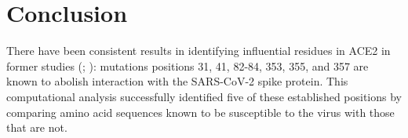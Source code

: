 \section{Conclusion}

There have been consistent results in identifying influential residues in ACE2 in former studies (; ): mutations positions 31, 41, 82-84, 353, 355, and 357 are known to abolish interaction with the SARS-CoV-2 spike protein. This computational analysis successfully identified five of these established positions by comparing amino acid sequences known to be susceptible to the virus with those that are not.